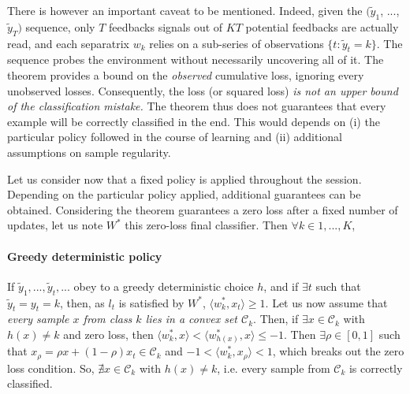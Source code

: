 \documentclass[preprint,12pt,authoryear]{elsarticle}
\begin{document}
There is however an important caveat to be mentioned. 
Indeed, given the  $ (\tilde{y}_1$, ..., $\tilde{y}_T)$ sequence, only $T$ feedbacks signals out of $KT$ potential feedbacks are actually read,
and each separatrix $w_k$ relies on a sub-series of observations $\{t: \tilde{y}_t = k\}$.
The sequence probes the environment without necessarily uncovering all of it. The theorem provides a bound on the \emph{observed} cumulative loss, ignoring every unobserved losses. 
Consequently, the loss (or squared loss) \emph{is not an upper bound of the classification mistake.} The theorem thus does not guarantees that every example will be correctly classified in the end. This would depends on (i) the particular policy followed in the course of learning and (ii)  additional assumptions on sample regularity.   

Let us consider now that a fixed policy is applied throughout the session. Depending on the particular policy applied, additional guarantees can be obtained.  
Considering the theorem guarantees a zero loss after a fixed number of updates, let us note  $W^*$ this zero-loss final classifier. Then $\forall k \in 1,...,K$, 




	\paragraph{Greedy deterministic policy} If $\tilde{y}_1, ...,\tilde{y}_t, ...$ obey to a greedy deterministic choice $h$, and if $\exists t$ such that $\tilde{y}_t = y_t = k$, then, as $l_t$ is satisfied by $W^*$, $\langle w_k^*, x_t\rangle \geq 1$. Let us now assume that \emph{every sample $x$ from class $k$ lies in a convex set $\mathcal{C}_k$}. Then, if $\exists x \in \mathcal{C}_k$ with $h(x) \neq k$ and zero loss, then $\langle w_k^*, x\rangle < \langle w_{h(x)}^*, x\rangle \leq -1$. Then $\exists \rho \in [0,1]$ such that $x_\rho = \rho x + (1-\rho) x_t \in \mathcal{C}_k$ and 
	$-1 < \langle w_k^*,x_\rho \rangle < 1 $, which breaks out the zero loss condition. So, $\nexists x \in \mathcal{C}_k$ with $h(x) \neq k$, i.e. every sample from $\mathcal{C}_k$ is correctly classified.
\end{document}
